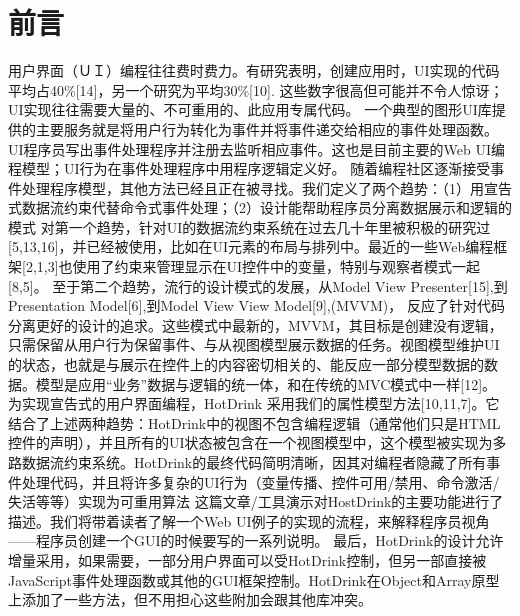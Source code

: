 \section*{前言}
用户界面（ＵＩ）编程往往费时费力。有研究表明，创建应用时，UI实现的代码平均占40\%[14]，另一个研究为平均30\%[10]. 这些数字很高但可能并不令人惊讶；UI实现往往需要大量的、不可重用的、此应用专属代码。
一个典型的图形UI库提供的主要服务就是将用户行为转化为事件并将事件递交给相应的事件处理函数。UI程序员写出事件处理程序并注册去监听相应事件。这也是目前主要的Web UI编程模型；UI行为在事件处理程序中用程序逻辑定义好。
随着编程社区逐渐接受事件处理程序模型，其他方法已经且正在被寻找。我们定义了两个趋势：（1）用宣告式数据流约束代替命令式事件处理；（2）设计能帮助程序员分离数据展示和逻辑的模式
对第一个趋势，针对UI的数据流约束系统在过去几十年里被积极的研究过[5,13,16]，并已经被使用，比如在UI元素的布局与排列中。最近的一些Web编程框架[2,1,3]也使用了约束来管理显示在UI控件中的变量，特别与观察者模式一起[8,5]。
至于第二个趋势，流行的设计模式的发展，从Model View Presenter[15],到Presentation Model[6],到Model View View Model[9],(MVVM)， 反应了针对代码分离更好的设计的追求。这些模式中最新的，MVVM，其目标是创建没有逻辑，只需保留从用户行为保留事件、与从视图模型展示数据的任务。视图模型维护UI的状态，也就是与展示在控件上的内容密切相关的、能反应一部分模型数据的数据。模型是应用“业务”数据与逻辑的统一体，和在传统的MVC模式中一样[12]。
为实现宣告式的用户界面编程，HotDrink 采用我们的属性模型方法[10,11,7]。它结合了上述两种趋势：HotDrink中的视图不包含编程逻辑（通常他们只是HTML控件的声明），并且所有的UI状态被包含在一个视图模型中，这个模型被实现为多路数据流约束系统。HotDrink的最终代码简明清晰，因其对编程者隐藏了所有事件处理代码，并且将许多复杂的UI行为（变量传播、控件可用/禁用、命令激活/失活等等）实现为可重用算法
这篇文章/工具演示对HostDrink的主要功能进行了描述。我们将带着读者了解一个Web UI例子的实现的流程，来解释程序员视角——程序员创建一个GUI的时候要写的一系列说明。
最后，HotDrink的设计允许增量采用，如果需要，一部分用户界面可以受HotDrink控制，但另一部直接被JavaScript事件处理函数或其他的GUI框架控制。HotDrink在Object和Array原型上添加了一些方法，但不用担心这些附加会跟其他库冲突。
